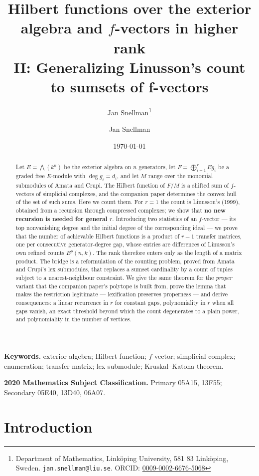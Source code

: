 \documentclass[11pt, a4paper, abstract=yes]{scrartcl}
\author{Jan Snellman\thanks{Department of Mathematics, Linköping University, 581 83 Linköping, Sweden. \texttt{jan.snellman@liu.se}. ORCID: \href{https://orcid.org/0009-0002-6676-5068}{0009-0002-6676-5068}}}
\author{Jan Snellman \orcidlink{0009-0002-6676-5068}}
\date{\today}
\title{Hilbert functions over the exterior algebra and \(f\)-vectors in higher rank\\\medskip
\large II: Generalizing Linusson's count to sumsets of f-vectors}
\theoremstyle{definition}
\theoremstyle{remark}
\theoremstyle{plain}
\begin{document}
\maketitle
\begin{abstract}
Let \(E=\bigwedge(k^n)\) be the exterior algebra on \(n\) generators, let
\(F=\bigoplus_{i=1}^{r}Eg_i\) be a graded free \(E\)-module with \(\deg g_i=d_i\), and let \(M\)
range over the monomial submodules of Amata and Crupi. The Hilbert function of \(F/M\) is a shifted
sum of \(f\)-vectors of simplicial complexes, and the companion paper \autocite{SnellmanArticle1} determines the convex hull of the
set of such sums. Here we count them. For \(r=1\) the count is Linusson's (1999), obtained from a
recursion through compressed complexes; we show that \textbf{no new recursion is needed for general
\(r\)}. Introducing two statistics of an \(f\)-vector --- its top nonvanishing degree and the initial
degree of the corresponding ideal --- we prove that the number of achievable Hilbert functions is a
product of \(r-1\) transfer matrices, one per consecutive generator-degree gap, whose entries are
differences of Linusson's own refined counts \(E^p(n,k)\). The rank therefore enters only as the
length of a matrix product. The bridge is a reformulation of the counting problem, proved from
Amata and Crupi's lex submodules, that replaces a sumset cardinality by a count of tuples subject to
a nearest-neighbour constraint. We give the same theorem for the \emph{proper} variant that the companion
paper's polytope is built from, prove the lemma that makes the restriction legitimate ---
lexification preserves properness --- and derive consequences: a linear recurrence in \(r\) for
constant gaps, polynomiality in \(r\) when all gaps vanish, an exact threshold beyond which the count
degenerates to a plain power, and polynomiality in the number of vertices.
\end{abstract}

\medskip\noindent\textbf{Keywords.} exterior algebra; Hilbert function; \(f\)-vector; simplicial
complex; enumeration; transfer matrix; lex submodule; Kruskal--Katona theorem.

\smallskip\noindent\textbf{2020 Mathematics Subject Classification.} Primary 05A15, 13F55;
Secondary 05E40, 13D40, 06A07.
\medskip

\setcounter{tocdepth}{2}
\tableofcontents
\section{Introduction}
\label{sec-intro}
\end{document}
